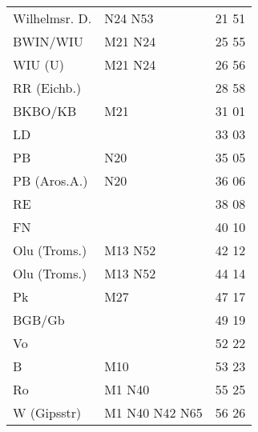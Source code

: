 \begin{tabular}{!{\color{schiefergrau}\vrule width 3pt}*{3}{l!{\color{schiefergrau}\vrule width 3pt}}}
\hline
{}
 \\
\hline
Wilhelmsr. D.& \nbus{} N24 N53                                                & 21 51 \\
BWIN/WIU     & \mbus{} M21 \nbus{} N24                                        & 25 55 \\
WIU (U)      & \mbus{} M21 \nbus{} N24                                        & 26 56 \\
RR (Eichb.)  &                                                                & 28 58 \\
BKBO/KB      & \mbus{} M21                                                    & 31 01 \\
LD           &                                                                & 33 03 \\
PB           & \nbus{} N20                                                    & 35 05 \\
PB (Aros.A.) & \nbus{} N20                                                    & 36 06 \\
RE           &                                                                & 38 08 \\
FN           &                                                                & 40 10 \\
Olu (Troms.) & \nuneun{} \mtram{} M13 \nbus{} N52                             & 42 12 \\
\hline
Olu (Troms.) & \nuneun{} \mtram{} M13 \nbus{} N52                             & 44 14 \\
Pk           & \mbus{} M27                                                    & 47 17 \\
BGB/Gb       &                                                                & 49 19 \\
Vo           &                                                                & 52 22 \\
B            & \mtram{} M10                                                   & 53 23 \\
Ro           & \mtram{} M1 \nbus{} N40                                        & 55 25 \\
W (Gipsstr)  & \mtram{} M1 \nbus{} N40 N42 N65                                & 56 26 \\

\end{tabular}
